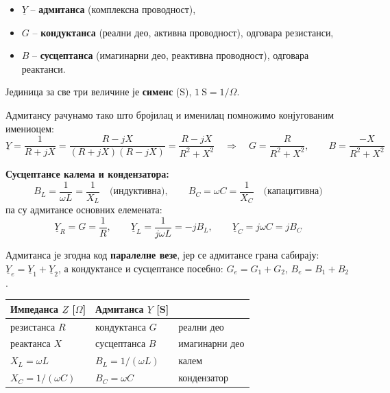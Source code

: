 \documentclass{article}
\begin{document}
\begin{itemize}[noitemsep]
    \item $\underline{Y}$ -- \textbf{адмитанса} (комплексна проводност),
    \item $G$ -- \textbf{кондуктанса} (реални део, активна проводност), одговара резистанси,
    \item $B$ -- \textbf{сусцептанса} (имагинарни део, реактивна проводност), одговара реактанси.
\end{itemize}
Јединица за све три величине је \textbf{сименс} (S), $1~\text{S} = 1/\Omega$.

Адмитансу рачунамо тако што бројилац и именилац помножимо конјугованим
имениоцем:
\[
\underline{Y} = \frac{1}{R + jX} = \frac{R - jX}{(R + jX)(R - jX)} = \frac{R - jX}{R^2 + X^2}
\quad\Longrightarrow\quad
G = \frac{R}{R^2 + X^2}, \qquad B = \frac{-X}{R^2 + X^2}
\]

\textbf{Сусцептансе калема и кондензатора:}
\[
B_L = \frac{1}{\omega L} = \frac{1}{X_L} \quad\text{(индуктивна)}, \qquad
B_C = \omega C = \frac{1}{X_C} \quad\text{(капацитивна)}
\]
па су адмитансе основних елемената:
\[
\underline{Y}_R = G = \frac{1}{R}, \qquad
\underline{Y}_L = \frac{1}{j\omega L} = -jB_L, \qquad
\underline{Y}_C = j\omega C = jB_C
\]

Адмитанса је згодна код \textbf{паралелне везе}, јер се адмитансе грана
сабирају: $\underline{Y}_e = \underline{Y}_1 + \underline{Y}_2$, а кондуктансе и
сусцептансе посебно: $G_e = G_1 + G_2$, $B_e = B_1 + B_2$.

\begin{center}
\renewcommand{\arraystretch}{1.3}
\begin{tabular}{lll}
    \toprule
    \textbf{Импеданса} $\underline{Z}$ [$\Omega$] & \textbf{Адмитанса} $\underline{Y}$ [S] & \\
    \midrule
    резистанса $R$  & кондуктанса $G$  & реални део \\
    реактанса $X$   & сусцептанса $B$  & имагинарни део \\
    $X_L = \omega L$ & $B_L = 1/(\omega L)$ & калем \\
    $X_C = 1/(\omega C)$ & $B_C = \omega C$ & кондензатор \\
    \bottomrule
\end{tabular}
\end{center}
\end{document}
